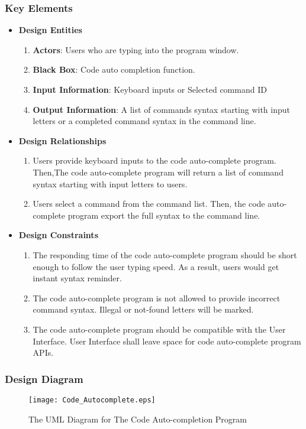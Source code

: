\documentclass [10pt]{article}
\begin{document}
\subsubsection{Key Elements}
\begin{itemize}
\item \textbf{Design Entities}
	\begin{enumerate}
	\item \textbf{Actors}: Users who are typing into the program window.
    \item \textbf{Black Box}: Code auto completion function.
    \item \textbf{Input Information}: Keyboard inputs or Selected command ID
    \item \textbf{Output Information}: A list of commands syntax starting with input letters or a  completed command syntax in the command line.
	\end{enumerate}
\item \textbf{Design Relationships}
	\begin{enumerate}
	\item Users provide keyboard inputs to the code auto-complete program. Then,The code auto-complete program will return a list of command syntax starting with input letters to users.
    \item Users select a command from the command list. Then, the code auto-complete program export the full syntax to the command line.
	\end{enumerate}
\item \textbf{Design Constraints}
	\begin{enumerate}
	\item The responding time of the code auto-complete program should be short enough to follow the user typing speed. As a result, users would get instant syntax reminder.
	\item The code auto-complete program is not allowed to provide incorrect command syntax. Illegal or not-found letters will be marked. 
	\item The code auto-complete program should be compatible with the User Interface. User Interface shall leave space for code auto-complete program APIs. 
	\end{enumerate}
\end{itemize}
\subsubsection{Design Diagram}
\begin{figure}[ht]
\centering
\texttt{[image: Code\_Autocomplete.eps]}
\caption{The UML Diagram for The Code Auto-completion Program}
\end{figure}
\newpage
\end{document}
